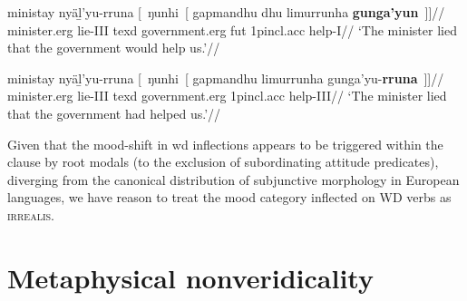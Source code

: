\a\begingl\gla ministay nyäḻ'yu-rruna \textup[~ŋunhi~\textup[ gapmandhu dhu limurrunha \textbf{gunga'yun}\textup{~]]}//
\glb minister.\gls{erg} lie-\gls{III} \gls{texd} government.\gls{erg} \gls{fut} 1p\gls{incl}.\gls{acc} help-\gls{I}//
\glft`The minister lied that the government would help us.'\trailingcitation{[DhG~20190417]}//\endgl

\a\begingl\gla ministay nyäḻ'yu-rruna \textup[~ŋunhi~\textup[ gapmandhu limurrunha gunga'yu-\textbf{rruna}\textup{~]]}//
\glb minister.\gls{erg} lie-\gls{III} \gls{texd} government.\gls{erg} 1p\gls{incl}.\gls{acc} help-\gls{III}//
\glft`The minister lied that the government had helped us.'\trailingcitation{[DhG~20190417]}//\endgl
\xe


\iffalse %
This being said, as a general strategy, \gls{wd} speakers appear to avoid these embedding constructions: modal flavour generally being provided by context as a pragmatically-retrieved conversational background (compare the Bible translation in \nextx.)

\ex\begingl\gla “Ŋuli dhu ga ŋula yolthu yolŋuy ŋayatham baṯpitjandja djarrpiny' yan rom, ŋayiny dhu ŋunhiyiny yolŋu dhiŋganhaman yan.''//
\glb \gls{hyp} \gls{fut} \gls{ipfv}.\gls{I} \gls{indef} who.\gls{erg} person.\gls{erg} hold.\gls{I} hold.firmly.\gls{I}.\gls{prom} crooked.\gls{prom} only law 3s.\gls{prom} \gls{fut} \gls{texd}.\gls{ana}.\gls{prom} person die.\gls{IV}.\gls{caus}.\gls{I} only//
\glft \textsc{free translation.}~`If any person adheres to wicked ways, that person ought to be killed.'\\
\textsc{}//
\endgl
\xe\fi



Given that the mood-shift in \gls{wd} inflections appears to be triggered within the clause by root modals (to the exclusion of subordinating attitude predicates), diverging from the canonical distribution of subjunctive morphology in European languages, we have reason \citep[following][]{Palmer2001} to treat the mood category inflected on WD verbs as \textsc{irrealis}.

\section{Metaphysical nonveridicality}



